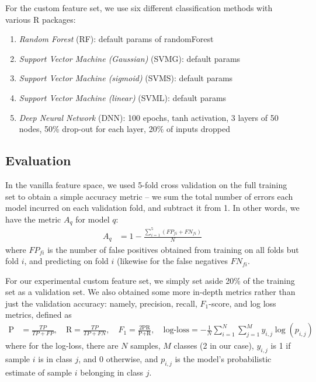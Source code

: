 \documentclass{article} %
\begin{document}
For the custom feature set, we use six different classification methods with various R packages: \cite{randomForest, meyer2014package}
\begin{enumerate}
\item \emph{Random Forest} (RF): default params of randomForest
\item \emph{Support Vector Machine (Gaussian)} (SVMG): default params
\item \emph{Support Vector Machine (sigmoid)} (SVMS): default params
\item \emph{Support Vector Machine (linear)} (SVML): default params
\item \emph{Deep Neural Network} (DNN): 100 epochs, tanh activation, 3 layers of 50 nodes, 50\% drop-out for each layer, 20\% of inputs dropped
\end{enumerate}
\subsection{Evaluation}
In the vanilla feature space, we used 5-fold cross validation on the full training set to obtain a simple accuracy metric -- we sum the total number of errors each model incurred on each validation fold, and subtract it from 1.\cite{kohavi1995study} In other words, we have the metric $A_q$ for model $q$:
\begin{align*}
A_q &= 1 - \frac{\sum_{i=1}^5(FP_{fi} + FN_{fi})}{N}
\end{align*}
where $FP_{fi}$ is the number of false positives obtained from training on all folds but fold $i$, and predicting on fold $i$ (likewise for the false negatives $FN_{fi}$.\par
For our experimental custom feature set, we simply set aside 20\% of the training set as a validation set.  We also obtained some more in-depth metrics rather than just the validation accuracy: namely, precision, recall, $F_1$-score, and log loss metrics, defined as
\begin{align*}
\text{P} &= \frac{TP}{TP + FP}, \hspace{1em} \text{R} = \frac{TP}{TP + FN}, \hspace{1em} F_1 = \frac{2\text{PR}}{\text{P} + \text{R}}, \hspace{1em} \text{log-loss} = -\frac{1}{N}\sum_{i=1}^N\sum_{j=1}^My_{i,j}\log(p_{i,j})
\end{align*}
where for the log-loss, there are $N$ samples, $M$ classes (2 in our case), $y_{i,j}$ is 1 if sample $i$ is in class $j$, and 0 otherwise, and $p_{i,j}$ is the model's probabilistic estimate of sample $i$ belonging in class $j$. \cite{powers2011evaluation}
\end{document}
